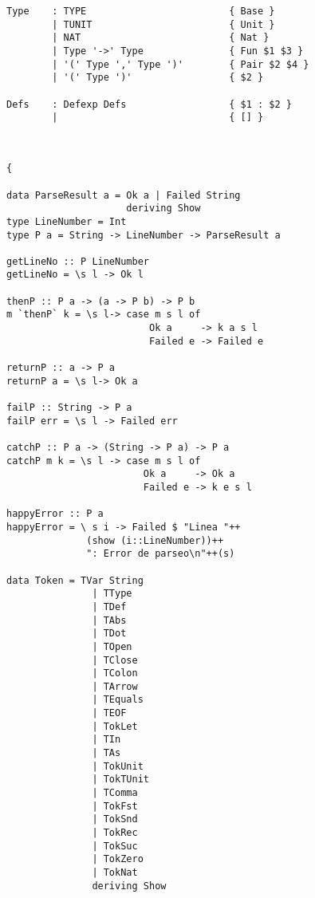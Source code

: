\documentclass[a4paper]{report}
\begin{document}
\begin{lstlisting}
Type    : TYPE                         { Base }
        | TUNIT                        { Unit }
        | NAT                          { Nat }
        | Type '->' Type               { Fun $1 $3 }
        | '(' Type ',' Type ')'        { Pair $2 $4 }
        | '(' Type ')'                 { $2 }

Defs    : Defexp Defs                  { $1 : $2 }
        |                              { [] }

\end{lstlisting}
\begin{lstlisting}


{

data ParseResult a = Ok a | Failed String
                     deriving Show                     
type LineNumber = Int
type P a = String -> LineNumber -> ParseResult a

getLineNo :: P LineNumber
getLineNo = \s l -> Ok l

thenP :: P a -> (a -> P b) -> P b
m `thenP` k = \s l-> case m s l of
                         Ok a     -> k a s l
                         Failed e -> Failed e
                         
returnP :: a -> P a
returnP a = \s l-> Ok a

failP :: String -> P a
failP err = \s l -> Failed err

catchP :: P a -> (String -> P a) -> P a
catchP m k = \s l -> case m s l of
                        Ok a     -> Ok a
                        Failed e -> k e s l

happyError :: P a
happyError = \ s i -> Failed $ "Linea "++
              (show (i::LineNumber))++
              ": Error de parseo\n"++(s)

data Token = TVar String
               | TType
               | TDef
               | TAbs
               | TDot
               | TOpen
               | TClose 
               | TColon
               | TArrow
               | TEquals
               | TEOF
               | TokLet
               | TIn
               | TAs
               | TokUnit
               | TokTUnit
               | TComma
               | TokFst
               | TokSnd
               | TokRec
               | TokSuc
               | TokZero
               | TokNat
               deriving Show

\end{lstlisting}
\pagebreak
\end{document}
